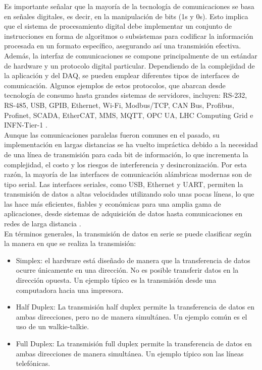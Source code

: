 \documentclass[]{book}
\begin{document}
\noindent Es importante señalar que la mayoría de la tecnología de comunicaciones se basa en señales digitales, es decir, en la manipulación de bits (1s y 0s). Esto implica que el sistema de procesamiento digital debe implementar un conjunto de instrucciones en forma de algoritmos o subsistemas para codificar la información procesada en un formato específico, asegurando así una transmisión efectiva. Además, la interfaz de comunicaciones se compone principalmente de un estándar de hardware y un protocolo digital particular. Dependiendo de la complejidad de la aplicación y del DAQ, se pueden emplear diferentes tipos de interfaces de comunicación. Algunos ejemplos de estos protocolos, que abarcan desde tecnología de consumo hasta grandes sistemas de servidores, incluyen: RS-232, RS-485, USB, GPIB, Ethernet, Wi-Fi, Modbus/TCP, CAN Bus, Profibus, Profinet, SCADA, EtherCAT, MMS, MQTT, OPC UA, LHC Computing Grid e INFN-Tier-1 \cite{zurawski2014industrial} \cite{bortolotti2012infn}.\\

\noindent Aunque las comunicaciones paralelas fueron comunes en el pasado, su implementación en largas distancias se ha vuelto impráctica debido a la necesidad de una línea de transmisión para cada bit de información, lo que incrementa la complejidad, el costo y los riesgos de interferencia y desincronización. Por esta razón, la mayoría de las interfaces de comunicación alámbricas modernas son de tipo serial. Las interfaces seriales, como USB, Ethernet y UART, permiten la transmisión de datos a altas velocidades utilizando solo unas pocas líneas, lo que las hace más eficientes, fiables y económicas para una amplia gama de aplicaciones, desde sistemas de adquisición de datos hasta comunicaciones en redes de larga distancia \cite{eeeguide_serial_communication_8251}.\\

\noindent En términos generales, la transmisión de datos en serie se puede clasificar según la manera en que se realiza la transmisión:
 \begin{itemize}
    \item Simplex: el hardware está diseñado de manera que la transferencia de datos ocurre únicamente en una dirección. No es posible transferir datos en la dirección opuesta. Un ejemplo típico es la transmisión desde una computadora hacia una impresora.
    \item Half Duplex: La transmisión half duplex permite la transferencia de datos en ambas direcciones, pero no de manera simultánea. Un ejemplo común es el uso de un walkie-talkie.
    \item Full Duplex: La transmisión full duplex permite la transferencia de datos en ambas direcciones de manera simultánea. Un ejemplo típico son las líneas telefónicas.
 \end{itemize}
\end{document}
